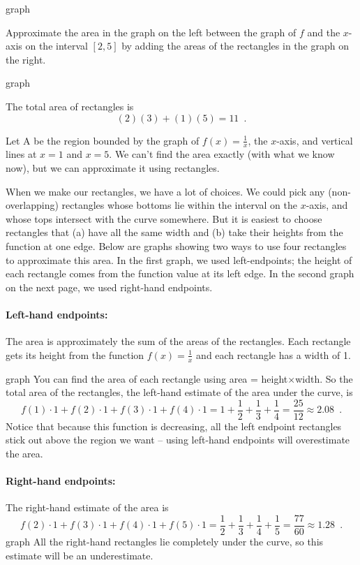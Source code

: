 graph
\begin{example}
Approximate the area in the graph on the left between the graph of $f$ and the $x$-axis on the interval $[2, 5]$ by adding the areas of the rectangles in the graph on the right.

graph
\begin{solution}
The total area of rectangles is
$$(2)(3)+(1)(5)=11 \enspace .$$
\end{solution}\end{example}

\begin{example}
Let A be the region bounded by the graph of $f(x)=\frac{1}{x}$, the $x$-axis, and vertical lines at $x=1$ and $x=5$. We can’t find the area exactly (with what we know now), but we can approximate it using rectangles.

\begin{solution}
When we make our rectangles, we have a lot of choices. We could pick any (non-overlapping) rectangles whose bottoms lie within the interval on the $x$-axis, and whose tops intersect with the curve somewhere. But it is easiest to choose rectangles that (a) have all the same width and (b) take their heights from the function at one edge. Below are graphs showing two ways to use four rectangles to approximate this area. In the first graph, we used left-endpoints; the height of each rectangle comes from the function value at its left edge. In the second graph on the next page, we used right-hand endpoints.

\paragraph{Left-hand endpoints:} The area is approximately the sum of the areas of the rectangles. Each rectangle gets its height from the function $f(x)=\frac{1}{x}$ and each rectangle has a width of 1.

graph
You can find the area of each rectangle using area = height$\times$width. So the total area of the rectangles, the left-hand estimate of the area under the curve, is
$$f(1) \cdot 1 + f(2) \cdot 1 + f(3) \cdot 1 + f(4) \cdot 1 = 1 + \frac{1}{2} + \frac{1}{3} + \frac{1}{4} = \frac{25}{12}\approx   2.08 \enspace .$$
Notice that because this function is decreasing, all the left endpoint rectangles stick out above the region we want – using left-hand endpoints will overestimate the area.

\paragraph{Right-hand endpoints:} The right-hand estimate of the area is
$$f(2) \cdot 1 + f(3) \cdot 1 + f(4) \cdot 1 + f(5) \cdot 1 = \frac{1}{2} + \frac{1}{3} + \frac{1}{4} + \frac{1}{5} = \frac{77}{60} \approx   1.28 \enspace .$$
graph
All the right-hand rectangles lie completely under the curve, so this estimate will be an underestimate.


\end{solution}
\end{example}
